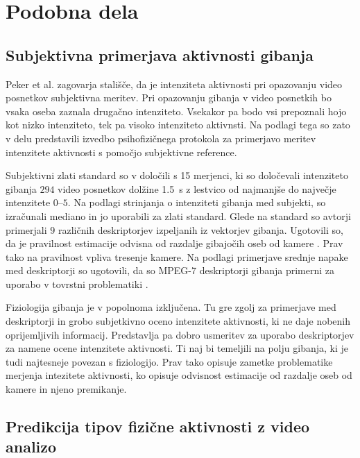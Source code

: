 \section{Podobna dela}\label{sec:podobna-dela}



\subsection{Subjektivna primerjava aktivnosti gibanja}\label{sec:subjektivna-primerjava}

Peker et al. \cite{peker2004framework} zagovarja stališče, da je intenziteta aktivnosti pri opazovanju video posnetkov subjektivna meritev. Pri opazovanju gibanja v video posnetkih bo vsaka oseba zaznala drugačno intenziteto. Vsekakor pa bodo vsi prepoznali hojo kot nizko intenziteto, tek pa visoko intenziteto aktivnsti. Na podlagi tega so zato v delu \cite{peker2004framework} predstavili izvedbo psihofizičnega protokola za primerjavo meritev intenzitete aktivnosti s pomočjo subjektivne reference.

Subjektivni zlati standard so v \cite{peker2004framework} določili s 15 merjenci, ki so določevali intenziteto gibanja $294$ video posnetkov dolžine \SI{1.5}{\s} z lestvico od najmanjše do največje intenzitete $0$--$5$. Na podlagi strinjanja o intenziteti gibanja med subjekti, so izračunali mediano in jo uporabili za zlati standard. Glede na standard so avtorji \cite{peker2004framework} primerjali $9$ različnih deskriptorjev izpeljanih iz vektorjev gibanja. Ugotovili so, da je pravilnost estimacije odvisna od razdalje gibajočih oseb od kamere \cite{peker2004framework}. Prav tako na pravilnost vpliva tresenje kamere. Na podlagi primerjave srednje napake med deskriptorji so ugotovili, da so MPEG-7 deskriptorji gibanja primerni za uporabo v tovrstni problematiki \cite{peker2004framework}.

Fiziologija gibanja je v \cite{peker2004framework} popolnoma izključena. Tu gre zgolj za primerjave med deskriptorji in grobo subjetkivno oceno intenzitete aktivnosti, ki ne daje nobenih oprijemljivih informacij. Predstavlja pa dobro usmeritev za uporabo deskriptorjev za namene ocene intenzitete aktivnosti. Ti naj bi temeljili na polju gibanja, ki je tudi najtesneje povezan s fiziologijo. Prav tako opisuje zametke problematike merjenja intezitete aktivnosti, ko opisuje odvisnost estimacije od razdalje oseb od kamere in njeno premikanje.




\subsection{Predikcija tipov fizične aktivnosti z video analizo}

